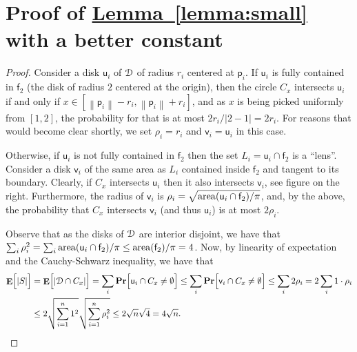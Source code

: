 \documentclass[12pt]{article}
\theoremstyle{remark}\theoremheaderfont{\sf}\theorembodyfont{\upshape}\newtheorem{defn}[theorem]{Definition}
\newcommand{\HLink}[2]{\hyperref[#2]{#1~\ref*{#2}}}
\newcommand{\apndlab}[1]{\label{apnd:#1}}
\newcommand{\lemref}[1]{\HLink{Lemma}{lemma:#1}}
\newcommand{\DSet}{\EuScript{D}}\newcommand{\PntSet}{{P}}\newcommand{\disk}{\mathsf{d}}\newcommand{\diskA}{\mathsf{f}}\newcommand{\diskB}{\mathsf{u}}\newcommand{\diskC}{\mathsf{v}}\newcommand{\pnt}{\mathsf{p}}\newcommand{\pntA}{\mathsf{q}}\newcommand{\pntB}{\mathsf{t}}\newcommand{\AreaX}[1]{\mathrm{area}\pth{#1}}
\newcommand{\pth}[1]{\mleft({#1}\mright)}
\newcommand{\Ex}[2][\!]{\mathop{\mathbf{E}}#1\pbrcx{#2}}
\newcommand{\Prob}[1]{\mathop{\mathbf{Pr}}\!\pbrcx{#1}}
\newcommand{\cardin}[1]{\left| {#1} \right|}\newcommand{\norm}[1]{\left\| {#1} \right\|}
\newcommand{\pbrcx}[1]{\left[ {#1} \right]}
\newcommand{\rad}{\rho}\newcommand{\areaX}[1]{\mathrm{area}\pth{#1}}
\begin{document}
\appendix

\section{Proof of \lemref{small} with a better constant}
\apndlab{better:c}


\begin{proof}
    Consider a disk $\diskB_i$ of $\DSet$ of radius $r_i$ centered at
    $\pnt_i$.  If $\diskB_i$ is fully contained in $\diskA_2$ (the
    disk of radius $2$ centered at the origin), then the circle $C_x$
    intersects $\diskB_i$ if and only if $x \in [\norm{\pnt_i} - r_i,
    \norm{\pnt_i} + r_i]$, and as $x$ is being picked uniformly from
    $[1,2]$, the probability for that is at most $2r_i/|2-1| =
    2r_i$. For reasons that would become clear shortly, we set $\rad_i
    = r_i$ and $\diskC_i = \diskB_i$ in this case.

    \vspace{-0.3cm}
    \vspace{0.3cm}

    Otherwise, if $\diskB_i$ is not fully contained in $\diskA_2$ then
    the set $L_i = \diskB_i \cap \diskA_2$ is a ``lens''. Consider a
    disk $\diskC_i$ of the same area as $L_i$ contained inside
    $\diskA_2$ and tangent to its boundary. Clearly, if $C_x$
    intersects $\diskB_i$ then it also intersects $\diskC_i$, see
    figure on the right. Furthermore, the radius of $\diskC_i$ is
    $\rad_i = \sqrt{\areaX{ \diskB_i \cap \diskA_2} /\pi}$, and, by
    the above, the probability that $C_x$ intersects $\diskC_i$ (and
    thus $\diskB_i$) is at most $2\rad_i$.

    Observe that as the disks of $\DSet$ are interior disjoint, we
    have that $\sum_i \rad_i^2 = \sum_i \areaX{\diskB_i \cap
       \diskA_2}/\pi \leq \AreaX{\diskA_2}/\pi = 4$.  Now, by
    linearity of expectation and the Cauchy-Schwarz inequality, we
    have that
    \begin{align*}\Ex{\cardin{S} \MakeBig\! }&=\Ex{\MakeBig\! \cardin{ \DSet \cap C_x}}=\sum_i \Prob{ \diskB_i \cap C_x \ne \emptyset \MakeBig }\leq \sum_i \Prob{ \diskC_i \cap C_x \ne \emptyset \MakeBig }\leq \sum_i 2\rad_i = 2 \sum_i 1 \cdot \rad_i\\& \leq 2 \sqrt{\sum_{i=1}^n 1^2} \sqrt{\sum_{i=1}^n \rad_i^2}\leq 2 \sqrt{n} \sqrt{4} = 4 \sqrt{n}. 
    \end{align*}
\end{proof}
\end{document}
